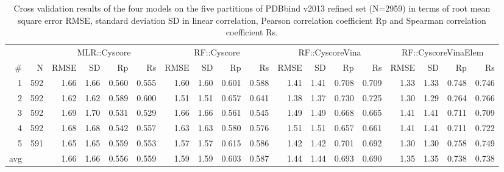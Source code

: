 \documentclass[linenumbers]{bmcart}
\begin{document}
\begin{backmatter}
\begin{sidewaystable}[ht]
\caption{Cross validation results of the four models on the five partitions of PDBbind v2013 refined set (N=2959) in terms of root mean square error RMSE, standard deviation SD in linear correlation, Pearson correlation coefficient Rp and Spearman correlation coefficient Rs.}
\label{tbl:cv}
\begin{tabular}{rrrrrrrrrrrrrrrrrr}
\hline
&&\multicolumn{4}{c}{MLR::Cyscore} & \multicolumn{4}{c}{RF::Cyscore} & \multicolumn{4}{c}{RF::CyscoreVina} & \multicolumn{4}{c}{RF::CyscoreVinaElem}\\
\# & N & RMSE & SD & Rp & Rs & RMSE & SD & Rp & Rs & RMSE & SD & Rp & Rs & RMSE & SD & Rp & Rs\\
\hline
  1 & 592 & 1.66 & 1.66 & 0.560 & 0.555 & 1.60 & 1.60 & 0.601 & 0.588 & 1.41 & 1.41 & 0.708 & 0.709 & 1.33 & 1.33 & 0.748 & 0.746\\
  2 & 592 & 1.62 & 1.62 & 0.589 & 0.600 & 1.51 & 1.51 & 0.657 & 0.641 & 1.38 & 1.37 & 0.730 & 0.725 & 1.30 & 1.29 & 0.764 & 0.766\\
  3 & 592 & 1.69 & 1.70 & 0.531 & 0.529 & 1.66 & 1.66 & 0.561 & 0.545 & 1.49 & 1.49 & 0.668 & 0.665 & 1.41 & 1.41 & 0.711 & 0.709\\
  4 & 592 & 1.68 & 1.68 & 0.542 & 0.557 & 1.63 & 1.63 & 0.580 & 0.576 & 1.51 & 1.51 & 0.657 & 0.661 & 1.41 & 1.41 & 0.711 & 0.722\\
  5 & 591 & 1.65 & 1.65 & 0.559 & 0.553 & 1.57 & 1.57 & 0.615 & 0.586 & 1.42 & 1.42 & 0.701 & 0.692 & 1.30 & 1.30 & 0.758 & 0.749\\
avg &     & 1.66 & 1.66 & 0.556 & 0.559 & 1.59 & 1.59 & 0.603 & 0.587 & 1.44 & 1.44 & 0.693 & 0.690 & 1.35 & 1.35 & 0.738 & 0.738\\
\hline
\end{tabular}
\end{sidewaystable}


\end{backmatter}
\end{document}
